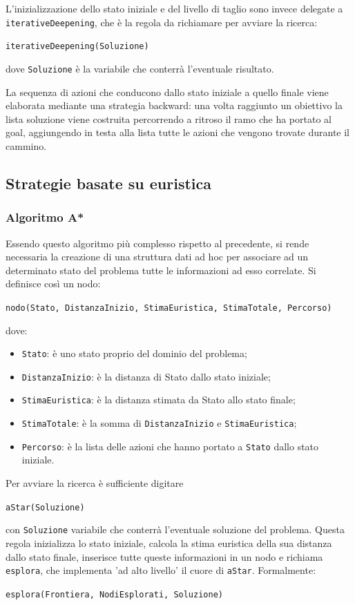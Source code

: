 \documentclass[a4paper,oneside,12pt]{book}
\def \code#1{\texttt{#1}}
\begin{document}
    L’inizializzazione dello stato iniziale e del livello di taglio sono invece delegate a \code{iterativeDeepening}, che è la regola da richiamare per avviare la ricerca:

    \begin{center}
        \code{iterativeDeepening(Soluzione)}
    \end{center}
    dove \code{Soluzione} è la variabile che conterrà l’eventuale risultato.

    La sequenza di azioni che conducono dallo stato iniziale a quello finale viene 		elaborata mediante una strategia backward: una volta raggiunto un obiettivo la lista 		soluzione viene costruita percorrendo a ritroso il ramo che ha portato al goal, 			aggiungendo in testa alla lista tutte le azioni che vengono trovate durante il cammino.

    \subsection*{Strategie basate su euristica}
    \subsubsection{Algoritmo A*}
    Essendo questo algoritmo più complesso rispetto al precedente, si rende necessaria la creazione di una struttura dati ad hoc per associare ad un determinato stato del problema tutte le informazioni ad esso correlate. Si definisce così un nodo:
    \begin{center}
        \code{nodo(Stato, DistanzaInizio, StimaEuristica, StimaTotale, Percorso)}
    \end{center}
    dove:
    \begin{itemize}
        \item \code{Stato}: è uno stato proprio del dominio del problema;
        \item \code{DistanzaInizio}: è la distanza di Stato dallo stato iniziale;
        \item \code{StimaEuristica}: è la distanza stimata da Stato allo stato finale;
        \item \code{StimaTotale}: è la somma di \code{DistanzaInizio} e \code{StimaEuristica};
        \item \code{Percorso}: è la lista delle azioni che hanno portato a \code{Stato} dallo stato iniziale.
    \end{itemize}
    Per avviare la ricerca è sufficiente digitare
    \begin{center}
        \code{aStar(Soluzione)}
    \end{center}
    con \code{Soluzione} variabile che conterrà l’eventuale soluzione del problema. Questa regola inizializza lo stato iniziale, calcola la stima euristica della sua distanza dallo stato finale, inserisce tutte queste informazioni in un nodo e richiama \code{esplora}, che implementa 'ad alto livello' il cuore di \code{aStar}. Formalmente:
    \begin{center}

        \code{esplora(Frontiera, NodiEsplorati, Soluzione)}
    \end{center}
\end{document}
